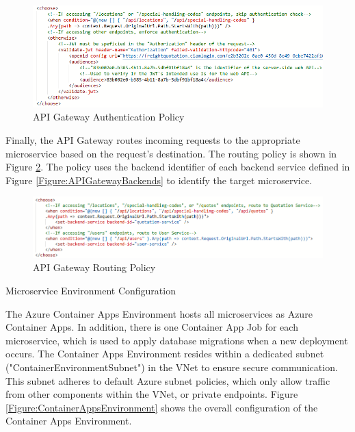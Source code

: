 \documentclass[12pt,reqno, oneside]{amsbook}
\makeatletter
\def\subsection{\@startsection{subsection}{2}%
      \z@{.5\linespacing\@plus.7\linespacing}{.25\linespacing}%
      {\normalfont\bfseries\flushleft}}
\theoremstyle{definition}
\theoremstyle{definition}
\numberwithin{section}{chapter}
\numberwithin{table}{chapter}
\numberwithin{figure}{chapter}
\makeatother
\begin{document}
\begin{figure}[H]
  \centering
  \includegraphics[width=0.9\linewidth]{images/APIGatewayConfigurationAuthentication.png}
  \caption{\label{Figure:APIGatewayConfigurationAuthentication}API Gateway Authentication Policy}
\end{figure}

Finally, the \ac{API} Gateway routes incoming requests to the appropriate microservice based on the request's destination. The routing policy is shown in Figure \ref{Figure:APIGatewayConfigurationRouting}. The policy uses the backend identifier of each backend service defined in Figure \ref{Figure:APIGatewayBackends} to identify the target microservice.

\begin{figure}[H]
  \centering
  \includegraphics[width=1\linewidth]{images/APIGatewayConfigurationRouting.png}
  \caption{\label{Figure:APIGatewayConfigurationRouting}API Gateway Routing Policy}
\end{figure}

\subsection{Microservice Environment Configuration}

The Azure Container Apps Environment hosts all microservices as Azure Container Apps. In addition, there is one Container App Job for each microservice, which is used to apply database migrations when a new deployment occurs. The Container Apps Environment resides within a dedicated subnet ("ContainerEnvironmentSubnet") in the \ac{VNet} to ensure secure communication. This subnet adheres to default Azure subnet policies, which only allow traffic from other components within the \ac{VNet}, or private endpoints. Figure \ref{Figure:ContainerAppsEnvironment} shows the overall configuration of the Container Apps Environment.
\end{document}
